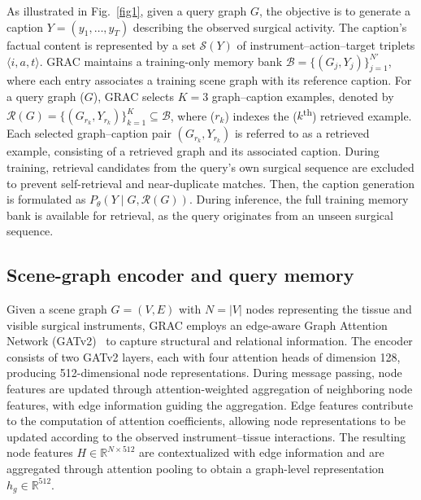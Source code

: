 \documentclass[11pt]{article}
\begin{document}
As illustrated in Fig.~\ref{fig1}, given a query graph $G$, the objective is to generate a caption $Y = (y_{1},\ldots,y_{T})$ describing the observed surgical activity. The caption's factual content is represented by a set $\mathcal{S}(Y)$ of instrument--action--target triplets $\langle i,a,t \rangle$. GRAC maintains a training-only memory bank $\mathcal{B} = \{ (G_{j},Y_{j}) \}_{j = 1}^{N'}$, where each entry associates a training scene graph with its reference caption. For a query graph ($G$), GRAC selects $K = 3$ graph--caption examples, denoted by $\mathcal{R}(G) = \{ (G_{r_{k}},Y_{r_{k}}) \}_{k = 1}^{K} \subseteq \mathcal{B}$, where ($r_{k}$) indexes the ($k$\textsuperscript{th}) retrieved example. Each selected graph--caption pair $(G_{r_{k}},Y_{r_{k}})$ is referred to as a retrieved example, consisting of a retrieved graph and its associated caption. During training, retrieval candidates from the query's own surgical sequence are excluded to prevent self-retrieval and near-duplicate matches. Then, the caption generation is formulated as $P_{\theta}(Y \mid G,\mathcal{R}(G))$. During inference, the full training memory bank is available for retrieval, as the query originates from an unseen surgical sequence.


\subsection{Scene-graph encoder and query memory}\label{subsec3.2}

Given a scene graph $G = (V,E)$ with $N = |V|$ nodes representing the tissue and visible surgical instruments, GRAC employs an edge-aware Graph Attention Network (GATv2)~\cite{b16} to capture structural and relational information.  The encoder consists of two GATv2 layers, each with four attention heads of dimension 128, producing 512-dimensional node representations. During message passing, node features are updated through attention-weighted aggregation of neighboring node features, with edge information guiding the aggregation. Edge features contribute to the computation of attention coefficients, allowing node representations to be updated according to the observed instrument--tissue interactions. The resulting node features $H \in \mathbb{R}^{N \times 512}$ are contextualized with edge information and are aggregated through attention pooling to obtain a graph-level representation $h_{g} \in \mathbb{R}^{512}$.
\end{document}
